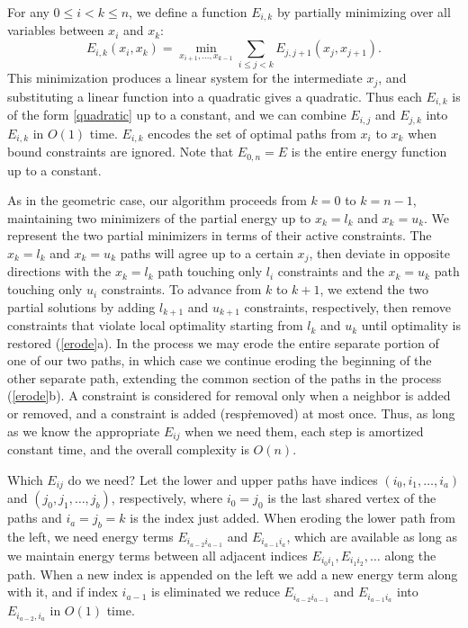 \documentclass[11pt]{article}
\begin{document}
For any $0 \le i < k \le n$, we define a function $E_{i,k}$ by partially minimizing over all variables between $x_i$ and $x_k$:
$$E_{i,k}(x_i,x_k) = \min_{x_{i+1}, \ldots, x_{k-1}} \sum_{i \le j < k} E_{j,j+1}(x_j,x_{j+1}).$$
This minimization produces a linear system for the intermediate $x_j$, and substituting a linear function into a quadratic gives a quadratic.  Thus each $E_{i,k}$ is of the form \autoref{quadratic} up to a constant,
and we can combine $E_{i,j}$ and $E_{j,k}$ into $E_{i,k}$ in $O(1)$ time.  $E_{i,k}$ encodes the set of optimal paths from $x_i$ to $x_k$ when bound constraints are ignored.  Note that $E_{0,n} = E$
is the entire energy function up to a constant.

As in the geometric case, our algorithm proceeds from $k = 0$ to $k = n-1$, maintaining two minimizers of the partial energy up to $x_k = l_k$ and $x_k = u_k$.  We represent the two partial minimizers in terms of
their active constraints.  The $x_k = l_k$ and $x_k = u_k$ paths will agree up to a certain $x_j$, then deviate
in opposite directions with the $x_k = l_k$ path touching only $l_i$ constraints and the $x_k = u_k$ path touching only $u_i$ constraints.  To advance from $k$ to $k+1$, we extend the two partial solutions by adding
$l_{k+1}$ and $u_{k+1}$ constraints, respectively, then remove constraints that violate local optimality starting from $l_k$ and $u_k$ until optimality is restored (\autoref{erode}a).  In the process we may erode the entire separate
portion of one of our two paths, in which case we continue eroding the beginning of the other separate path, extending the common section of the paths in the process (\autoref{erode}b).
A constraint is considered for removal only when a neighbor is added or removed, and a constraint is added (resp\. removed) at most once.  Thus, as long as we know the appropriate $E_{ij}$ when we need them, each step
is amortized constant time, and the overall complexity is $O(n)$.

Which $E_{ij}$ do we need?  Let the lower and upper paths have indices $(i_0, i_1, \ldots, i_a)$ and $(j_0, j_1, \ldots, j_b)$, respectively, where $i_0 = j_0$ is the last shared vertex of the paths
and $i_a = j_b = k$ is the index just added.  When eroding the lower path from the left, we need energy terms $E_{i_{a-2}i_{a-1}}$ and $E_{i_{a-1}i_{a}}$, which are available as long as we maintain
energy terms between all adjacent indices $E_{i_0i_1}, E_{i_1i_2}, \ldots$ along the path.  When a new index is appended on the left we add a new energy term along with it, and if index $i_{a-1}$ is
eliminated we reduce $E_{i_{a-2}i_{a-1}}$ and $E_{i_{a-1}i_{a}}$ into $E_{i_{a-2},i_a}$ in $O(1)$ time.
\end{document}
